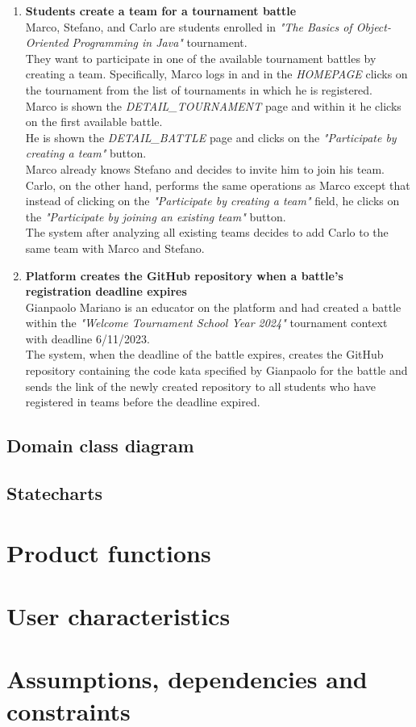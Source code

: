 \begin{enumerate}
		\item \textbf{Students create a team for a tournament battle}\\
Marco, Stefano, and Carlo are students enrolled in \emph{"The Basics of Object-Oriented Programming in Java"} tournament.\\
They want to participate in one of the available tournament battles by creating a team.
Specifically, Marco logs in and in the \emph{HOMEPAGE} clicks on the tournament from the list of tournaments in which he is registered.\\
Marco is shown the \emph{DETAIL\_TOURNAMENT} page and within it he clicks on the first available battle.\\
He is shown the \emph{DETAIL\_BATTLE} page and clicks on the \emph{"Participate by creating a team"} button.\\
Marco already knows Stefano and decides to invite him to join his team.\\
Carlo, on the other hand, performs the same operations as Marco except that instead of clicking on the \emph{"Participate by creating a team"} field, he clicks on the \emph{"Participate by joining an existing team"} button.\\
The system after analyzing all existing teams decides to add Carlo to the same team with Marco and Stefano.
		
		\item \textbf{Platform creates the GitHub repository when a battle's registration deadline expires}\\
Gianpaolo Mariano is an educator on the platform and had created a battle within the \emph{"Welcome Tournament School Year 2024"} tournament context with deadline 6/11/2023.\\
The system, when the deadline of the battle expires, creates the GitHub repository containing the code kata specified by Gianpaolo for the battle and sends the link of the newly created repository to all students who have registered in teams before the deadline expired.

    	
\end{enumerate}


\subsection{Domain class diagram}

\subsection{Statecharts}




\section{Product functions}



\section{User characteristics}



\section{Assumptions, dependencies and constraints}

